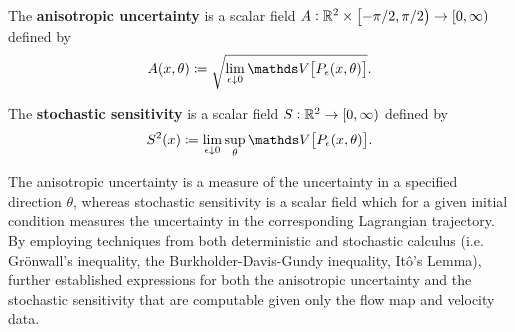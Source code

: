 \begin{definition}
	\begin{alpharate}
		\item The \textbf{anisotropic uncertainty} is a scalar field \(A: \mathbb{R}^2\times\left[-\pi/2, \pi/2\right) \to [0,\infty)\) defined by
		\[
			A(x,\theta) \coloneqq \sqrt{\lim_{\epsilon\downarrow 0}\var{P_\epsilon(x,\theta)}}.
		\]

		\item The \textbf{stochastic sensitivity} is a scalar field \(S: \mathbb{R}^2 \to [0,\infty)\) defined by
		\[
			S^2(x) \coloneqq \lim_{\epsilon\downarrow 0}\sup_{\theta}{\var{P_\epsilon(x,\theta)}}.
		\]
	\end{alpharate}
\end{definition}

The anisotropic uncertainty is a measure of the uncertainty in a specified direction \(\theta\), whereas stochastic sensitivity is a scalar field which for a given initial condition measures the uncertainty in the corresponding Lagrangian trajectory.
By employing techniques from both deterministic and stochastic calculus (i.e. Gr\"onwall's inequality, the Burkholder-Davis-Gundy inequality, It\^o's Lemma), \citet{Balasuriya_2020_StochasticSensitivityComputable} further established expressions for both the anisotropic uncertainty and the stochastic sensitivity that are computable given only the flow map and velocity data.

